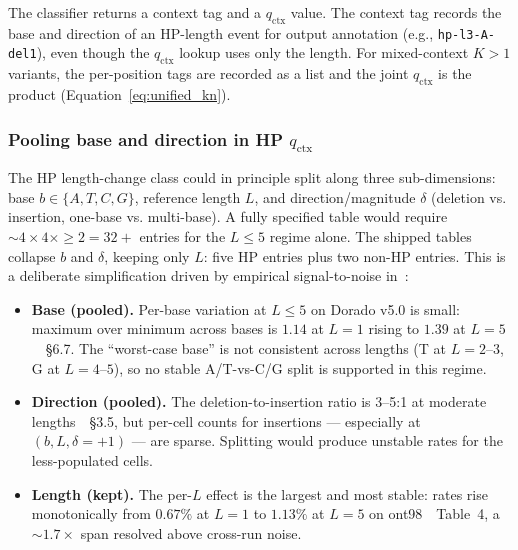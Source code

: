 \documentclass[11pt]{article}
\begin{document}
The classifier returns a context tag and a $q_\text{ctx}$ value. The context
tag records the base and direction of an HP-length event for output
annotation (e.g., \texttt{hp-l3-A-del1}), even though the $q_\text{ctx}$
lookup uses only the length. For mixed-context $K > 1$ variants, the
per-position tags are
recorded as a list and the joint $q_\text{ctx}$ is the product
(Equation~\ref{eq:unified_kn}).

\subsubsection{Pooling base and direction in HP $q_\text{ctx}$}
\label{sec:qctx_pooling}

The HP length-change class could in principle split along three sub-dimensions:
base $b \in \{A, T, C, G\}$, reference length $L$, and direction/magnitude
$\delta$ (deletion vs. insertion, one-base vs. multi-base). A fully specified
table would require $\sim\!4 \times 4 \times \geq\!2 = 32+$ entries for the
$L \leq 5$ regime alone. The shipped tables collapse $b$ and $\delta$, keeping
only $L$: five HP entries plus two non-HP entries. This is a deliberate
simplification driven by empirical signal-to-noise in~\cite{hp_paper}:

\begin{itemize}
\item \textbf{Base (pooled).} Per-base variation at $L \leq 5$ on Dorado v5.0
is small: maximum over minimum across bases is $1.14$ at $L = 1$ rising to
$1.39$ at $L = 5$~\cite{hp_paper}~\S 6.7. The ``worst-case base'' is not
consistent across lengths (T at $L = 2$--$3$, G at $L = 4$--$5$), so no
stable A/T-vs-C/G split is supported in this regime.

\item \textbf{Direction (pooled).} The deletion-to-insertion ratio is 3--5:1
at moderate lengths~\cite{hp_paper}~\S 3.5, but per-cell counts for
insertions --- especially at $(b, L, \delta = +\!1)$ --- are sparse. Splitting
would produce unstable rates for the less-populated cells.

\item \textbf{Length (kept).} The per-$L$ effect is the largest and most
stable: rates rise monotonically from $0.67\%$ at $L = 1$ to $1.13\%$ at
$L = 5$ on ont98~\cite{hp_paper}~Table~4, a $\sim\!1.7\times$ span resolved
above cross-run noise.
\end{itemize}
\end{document}
